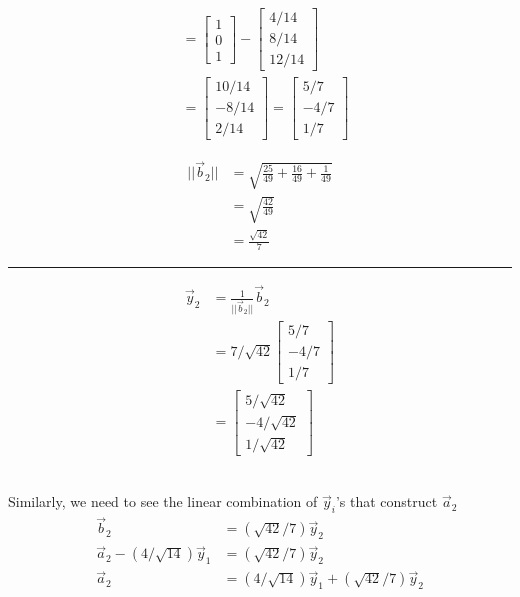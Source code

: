 \documentclass{report}
\begin{document}
{\begin{minipage}{0.45\textwidth}
$$\begin{aligned}
&=\begin{bmatrix}1\\0\\1\end{bmatrix} - \begin{bmatrix}4/14\\8/14\\12/14\end{bmatrix}\\
&=\begin{bmatrix}10/14\\-8/14\\2/14\end{bmatrix} = \begin{bmatrix}5/7\\-4/7\\1/7\end{bmatrix}
\end{aligned}
$$
\end{minipage}
\begin{minipage}{0.45\textwidth}
$$
\begin{aligned}
||\vec{b}_2|| &= \sqrt{\frac{25}{49} + \frac{16}{49} + \frac{1}{49}}\\
&=\sqrt{\frac{42}{49}}\\
&=\frac{\sqrt{42}}{7}
\end{aligned}
$$
\hrule
\vspace{0.5em}
$$
\begin{aligned}
\vec{y}_2 &= \frac{1}{||\vec{b}_2||}\vec{b}_2\\
&=7/\sqrt{42} \begin{bmatrix}5/7\\-4/7\\1/7\end{bmatrix}\\
&=\begin{bmatrix}5/\sqrt{42}\\-4/\sqrt{42}\\1/\sqrt{42}\end{bmatrix}
\end{aligned}
$$
\end{minipage}\\
Similarly,  we need to see the linear combination of $\vec{y}_i$'s that construct $\vec{a}_2$
$$
\begin{aligned}
\vec{b}_2 &= (\sqrt{42}/7)\vec{y}_2\\
\vec{a}_2 - (4/\sqrt{14})\vec{y}_1 &= (\sqrt{42}/7)\vec{y}_2\\
\vec{a}_2 & = (4/\sqrt{14})\vec{y}_1 + (\sqrt{42}/7)\vec{y}_2

\end{aligned}$$}
\end{document}

